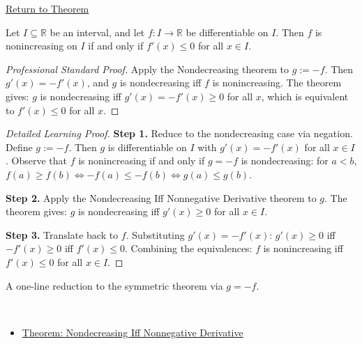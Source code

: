 \newpage
{}
\label{prf:nonincreasing-iff-nonpos-derivative}

\begin{remark*}[Return]
\hyperref[thm:nonincreasing-iff-nonpos-derivative]{Return to Theorem}
\end{remark*}

\begin{theorem*}
Let $I \subseteq \mathbb{R}$ be an interval, and let $f : I \to \mathbb{R}$ be differentiable on $I$. Then $f$ is nonincreasing on $I$ if and only if $f'(x) \leq 0$ for all $x \in I$.
\end{theorem*}

\begin{proof}[Professional Standard Proof]
\LRAProofBodyStart
Apply the Nondecreasing theorem to $g := -f$. Then $g'(x) = -f'(x)$, and $g$ is nondecreasing iff $f$ is nonincreasing. The theorem gives: $g$ is nondecreasing iff $g'(x) = -f'(x) \geq 0$ for all $x$, which is equivalent to $f'(x) \leq 0$ for all $x$.
\end{proof}

\begin{proof}[Detailed Learning Proof]
\LRAProofBodyStart

\textbf{Step 1.} Reduce to the nondecreasing case via negation. Define $g := -f$. Then $g$ is differentiable on $I$ with $g'(x) = -f'(x)$ for all $x \in I$. Observe that $f$ is nonincreasing if and only if $g = -f$ is nondecreasing: for $a < b$, $f(a) \geq f(b) \iff -f(a) \leq -f(b) \iff g(a) \leq g(b)$.

\textbf{Step 2.} Apply the Nondecreasing Iff Nonneg\-ative Derivative theorem to $g$. The theorem gives: $g$ is nondecreasing iff $g'(x) \geq 0$ for all $x \in I$.

\textbf{Step 3.} Translate back to $f$. Substituting $g'(x) = -f'(x)$: $g'(x) \geq 0$ iff $-f'(x) \geq 0$ iff $f'(x) \leq 0$. Combining the equivalences: $f$ is nonincreasing iff $f'(x) \leq 0$ for all $x \in I$.
\end{proof}

\begin{remark*}
A one-line reduction to the symmetric theorem via $g = -f$.
\end{remark*}

\begin{remark*}[Dependencies]~\\
\begin{itemize}
  \item \hyperref[thm:nondecreasing-iff-nonneg-derivative]{Theorem: Nondecreasing Iff Nonneg\-ative Derivative}
\end{itemize}
\end{remark*}

\clearpage
